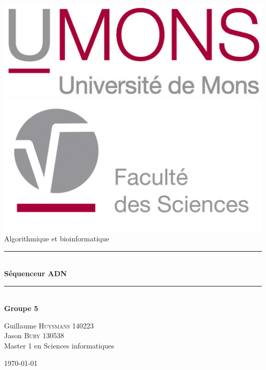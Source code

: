 \newcommand{\myTitleOfTitlepage}{Séquenceur ADN}
\newcommand{\courseTitleOfTitlepage}{Algorithmique et bioinformatique}

\begin{titlepage}
\begin{center}
\includegraphics[scale=1.50]{figures/UMONS.jpg}\\[0.4cm]
\includegraphics[scale=0.30]{figures/FS_Logo.jpg}\\[3cm]
{\huge \courseTitleOfTitlepage}\\
\vspace{0.9mm}
\rule{9.5cm}{0.5mm}\\[0.5cm]
{\huge \bfseries \myTitleOfTitlepage}\\[0.2cm]
\rule{9.5cm}{0.5mm}\\
\textbf{Groupe 5}
\\[7cm]
      \begin{flushleft} \large
        Guillaume \textsc{Huysmans} 140223\\
        Jason \textsc{Bury} 130538\\
        Master 1 en Sciences informatiques\\
      \end{flushleft}
   \vfill
  {\large \today}
\end{center}
\end{titlepage}